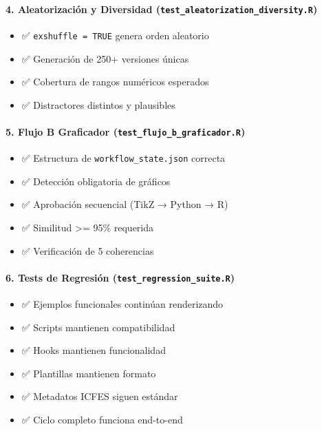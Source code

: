 \documentclass[
]{article}
\providecommand{\tightlist}{%
  \setlength{\itemsep}{0pt}\setlength{\parskip}{0pt}}
\begin{document}
\paragraph{\texorpdfstring{4. \textbf{Aleatorización y Diversidad}
(\texttt{test\_aleatorization\_diversity.R})}{4. Aleatorización y Diversidad (test\_aleatorization\_diversity.R)}}\label{aleatorizaciuxf3n-y-diversidad-test_aleatorization_diversity.r}

\begin{itemize}
\tightlist
\item
  ✅ \texttt{exshuffle\ =\ TRUE} genera orden aleatorio
\item
  ✅ Generación de 250+ versiones únicas
\item
  ✅ Cobertura de rangos numéricos esperados
\item
  ✅ Distractores distintos y plausibles
\end{itemize}

\paragraph{\texorpdfstring{5. \textbf{Flujo B Graficador}
(\texttt{test\_flujo\_b\_graficador.R})}{5. Flujo B Graficador (test\_flujo\_b\_graficador.R)}}\label{flujo-b-graficador-test_flujo_b_graficador.r}

\begin{itemize}
\tightlist
\item
  ✅ Estructura de \texttt{workflow\_state.json} correcta
\item
  ✅ Detección obligatoria de gráficos
\item
  ✅ Aprobación secuencial (TikZ → Python → R)
\item
  ✅ Similitud \textgreater= 95\% requerida
\item
  ✅ Verificación de 5 coherencias
\end{itemize}

\paragraph{\texorpdfstring{6. \textbf{Tests de Regresión}
(\texttt{test\_regression\_suite.R})}{6. Tests de Regresión (test\_regression\_suite.R)}}\label{tests-de-regresiuxf3n-test_regression_suite.r}

\begin{itemize}
\tightlist
\item
  ✅ Ejemplos funcionales continúan renderizando
\item
  ✅ Scripts mantienen compatibilidad
\item
  ✅ Hooks mantienen funcionalidad
\item
  ✅ Plantillas mantienen formato
\item
  ✅ Metadatos ICFES siguen estándar
\item
  ✅ Ciclo completo funciona end-to-end
\end{itemize}
\end{document}
